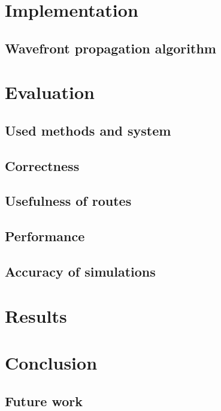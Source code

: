 \documentclass[
	12pt,
	a4paper,
	usegeometry,
	twoside,
	openright,
	toc=chapterentrywithdots
]{scrreprt}
\begin{document}
	\chapter{Implementation}
	
		\section{Wavefront propagation algorithm}
	
	\chapter{Evaluation}
	
		\section{Used methods and system}
	
		\section{Correctness}
		
		\section{Usefulness of routes}
	
		\section{Performance}
		
		\section{Accuracy of simulations}
	
	\chapter{Results}
	
	\chapter{Conclusion}
	
		\section{Future work}
\end{document}
